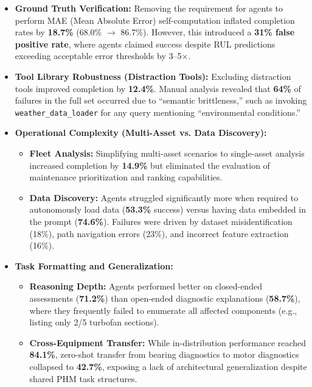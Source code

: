 \documentclass[sigconf, screen, nonacm]{acmart}
\begin{document}
\begin{itemize}
    \item \textbf{Ground Truth Verification:} Removing the requirement for agents to perform MAE (Mean Absolute Error) self-computation inflated completion rates by \textbf{18.7\%} (68.0\% $\rightarrow$ 86.7\%). However, this introduced a \textbf{31\% false positive rate}, where agents claimed success despite RUL predictions exceeding acceptable error thresholds by 3--5$\times$.
    
    \item \textbf{Tool Library Robustness (Distraction Tools):} Excluding distraction tools improved completion by \textbf{12.4\%}. Manual analysis revealed that \textbf{64\%} of failures in the full set occurred due to ``semantic brittleness,'' such as invoking \texttt{weather\_data\_loader} for any query mentioning ``environmental conditions.''
    
    \item \textbf{Operational Complexity (Multi-Asset vs. Data Discovery):}
    \begin{itemize}
        \item \textbf{Fleet Analysis:} Simplifying multi-asset scenarios to single-asset analysis increased completion by \textbf{14.9\%} but eliminated the evaluation of maintenance prioritization and ranking capabilities.
        \item \textbf{Data Discovery:} Agents struggled significantly more when required to autonomously load data (\textbf{53.3\%} success) versus having data embedded in the prompt (\textbf{74.6\%}). Failures were driven by dataset misidentification (18\%), path navigation errors (23\%), and incorrect feature extraction (16\%).
    \end{itemize}

    \item \textbf{Task Formatting and Generalization:}
    \begin{itemize}
        \item \textbf{Reasoning Depth:} Agents performed better on closed-ended assessments (\textbf{71.2\%}) than open-ended diagnostic explanations (\textbf{58.7\%}), where they frequently failed to enumerate all affected components (e.g., listing only 2/5 turbofan sections).
        \item \textbf{Cross-Equipment Transfer:} While in-distribution performance reached \textbf{84.1\%}, zero-shot transfer from bearing diagnostics to motor diagnostics collapsed to \textbf{42.7\%}, exposing a lack of architectural generalization despite shared PHM task structures.
    \end{itemize}
\end{itemize}
\end{document}
